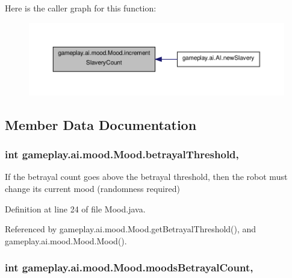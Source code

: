 Here is the caller graph for this function\-:
\nopagebreak
\begin{figure}[H]
\begin{center}
\leavevmode
\includegraphics[width=350pt]{a00015_ac416312a82ad5afce4090858b47b0c96_icgraph}
\end{center}
\end{figure}




\subsection{Member Data Documentation}
\hypertarget{a00015_af8ba28f8a5e568f223c07e0acb788be9}{
\subsubsection[{betrayal\-Threshold}]{\setlength{\rightskip}{0pt plus 5cm}int gameplay.\-ai.\-mood.\-Mood.\-betrayal\-Threshold\hspace{0.3cm}{\ttfamily [protected]}, {\ttfamily [inherited]}}}\label{a00015_af8ba28f8a5e568f223c07e0acb788be9}


If the betrayal count goes above the betrayal threshold, then the robot must change its current mood (randomness required) 



Definition at line 24 of file Mood.\-java.



Referenced by gameplay.\-ai.\-mood.\-Mood.\-get\-Betrayal\-Threshold(), and gameplay.\-ai.\-mood.\-Mood.\-Mood().

\hypertarget{a00015_ae300727f17efc1d32e7cc1731f9935fa}{
\subsubsection[{moods\-Betrayal\-Count}]{\setlength{\rightskip}{0pt plus 5cm}int gameplay.\-ai.\-mood.\-Mood.\-moods\-Betrayal\-Count\hspace{0.3cm}{\ttfamily [protected]}, {\ttfamily [inherited]}}}\label{a00015_ae300727f17efc1d32e7cc1731f9935fa}


